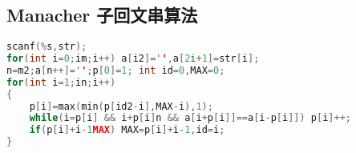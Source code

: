 \subsection{Manacher 子回文串算法}
    \begin{lstlisting}[language=c++]
scanf(%s,str);
for(int i=0;im;i++) a[i2]='',a[2i+1]=str[i];
n=m2;a[n++]='';p[0]=1; int id=0,MAX=0;
for(int i=1;in;i++)
{
	p[i]=max(min(p[id2-i],MAX-i),1);
	while(i=p[i] && i+p[i]n && a[i+p[i]]==a[i-p[i]]) p[i]++;
	if(p[i]+i-1MAX) MAX=p[i]+i-1,id=i;
}
    \end{lstlisting}
